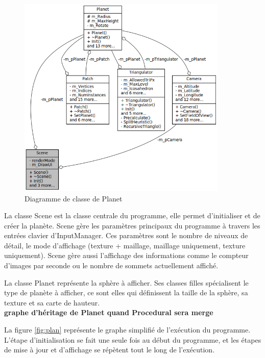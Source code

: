   \begin{figure}
  \centering
  \includegraphics[width=10cm]{img/uml_scene.png}
  \caption{Diagramme de classe de Planet}
  \label{fig:uml_scene}
  \end{figure}

  La classe Scene est la classe centrale du programme, elle permet
  d'initialiser et de créer la planète. Scene gère les paramètres
  principaux du programme à travers les entrées clavier d'InputManager.
  Ces paramètres sont le nombre de niveaux de détail, le mode d'affichage
  (texture + maillage, maillage uniquement, texture uniquement). Scene
  gère aussi l'affichage des informations comme le compteur d'images par
  seconde ou le nombre de sommets actuellement affiché.
  
  La classe Planet représente la sphère à afficher. Ses classes filles
  spécialisent le type de planète à afficher, ce sont elles qui
  définissent la taille de la sphère, sa texture et sa carte de hauteur.\\
  \textbf{graphe d'héritage de Planet quand Procedural sera merge}
  
 
  La figure \ref{fig:plan} représente le graphe simplifié de
  l'exécution du programme. L'étape d'initialisation se fait une seule
  fois au début du programme, et les étapes de mise à jour et d'affichage
  se répètent tout le long de l'exécution.
  
